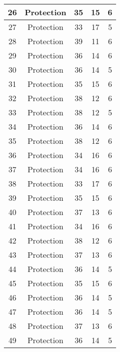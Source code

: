 \documentclass[results.tex]{subfiles}
\begin{document}
\begin{center}
\begin{tabular}{| c || c | c | c | c |}
    \hline
    26 & Protection & 35 & 15 & 6 \\ 
    \hline
    27 & Protection & 33 & 17 & 5 \\ 
    \hline
    28 & Protection & 39 & 11 & 6 \\ 
    \hline
    29 & Protection & 36 & 14 & 6 \\ 
    \hline
    30 & Protection & 36 & 14 & 5 \\ 
    \hline
    31 & Protection & 35 & 15 & 6 \\ 
    \hline
    32 & Protection & 38 & 12 & 6 \\ 
    \hline
    33 & Protection & 38 & 12 & 5 \\ 
    \hline
    34 & Protection & 36 & 14 & 6 \\ 
    \hline
    35 & Protection & 38 & 12 & 6 \\ 
    \hline
    36 & Protection & 34 & 16 & 6 \\ 
    \hline
    37 & Protection & 34 & 16 & 6 \\ 
    \hline
    38 & Protection & 33 & 17 & 6 \\ 
    \hline
    39 & Protection & 35 & 15 & 6 \\ 
    \hline
    40 & Protection & 37 & 13 & 6 \\ 
    \hline
    41 & Protection & 34 & 16 & 6 \\ 
    \hline
    42 & Protection & 38 & 12 & 6 \\ 
    \hline
    43 & Protection & 37 & 13 & 6 \\ 
    \hline
    44 & Protection & 36 & 14 & 5 \\ 
    \hline
    45 & Protection & 35 & 15 & 6 \\ 
    \hline
    46 & Protection & 36 & 14 & 5 \\ 
    \hline
    47 & Protection & 36 & 14 & 5 \\ 
    \hline
    48 & Protection & 37 & 13 & 6 \\ 
    \hline
    49 & Protection & 36 & 14 & 5 \\ 
    \hline   \end{tabular}
\end{center}
\end{document}
